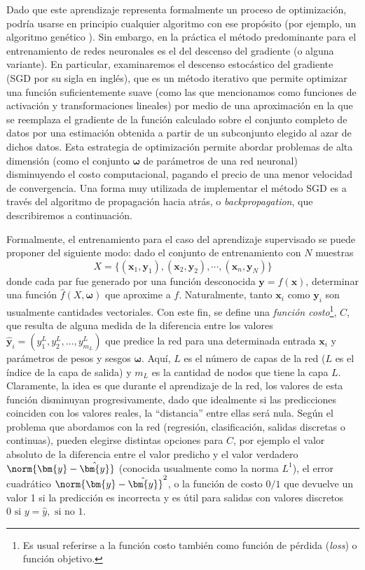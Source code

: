 Dado que este aprendizaje representa formalmente un proceso de optimización, podría usarse en principio cualquier algoritmo con ese propósito (por ejemplo, un algoritmo genético \cite{gupta1999, mirjalili2019, lanham2023}). Sin embargo, en la práctica el método predominante para el entrenamiento de redes neuronales es el del descenso del gradiente (o alguna variante). En particular, examinaremos el descenso estocástico del gradiente (SGD por su sigla en inglés), que es un método iterativo que permite optimizar una función suficientemente suave (como las que mencionamos como funciones de activación y transformaciones lineales) por medio de una aproximación en la que se reemplaza el gradiente de la función calculado sobre el conjunto completo de datos por una estimación obtenida a partir de un subconjunto elegido al azar de dichos datos. Esta estrategia de optimización permite abordar problemas de alta dimensión (como el conjunto $\bm{\omega}$ de parámetros de una red neuronal) disminuyendo el costo computacional, pagando el precio de una menor velocidad de convergencia. Una forma muy utilizada de implementar el método SGD es a través del algoritmo de propagación hacia atrás, o \textit{backpropagation}, que describiremos a continuación.

Formalmente, el entrenamiento para el caso del aprendizaje supervisado se puede proponer del siguiente modo: dado el conjunto de entrenamiento con $N$ muestras
\[ X = \{ (\bm{x}_1,\bm{y}_1), (\bm{x}_2, \bm{y}_2), \cdots, (\bm{x}_n, \bm{y}_N) \} \]
donde cada par fue generado por una función desconocida $\bm{y} = f(\bm{x})$, determinar una función $\hat{f}(X, \bm{\omega})$ que aproxime a $f$. Naturalmente, tanto $\bm{x}_i$ como $\bm{y}_i$ son usualmente cantidades vectoriales. Con este fin, se define una \textit{función costo}\footnote{Es usual referirse a la función costo también como función de pérdida (\textit{loss}) o función objetivo.}, $C$, que resulta de alguna medida de la diferencia entre los valores $\hat{\bm{y}}_i = (y_1^L, y_2^L, \ldots, y_{m_L}^L)$ que predice la red para una determinada entrada $\bm{x}_i$ y parámetros de pesos y sesgos $\bm{\omega}$. Aquí, $L$ es el número de capas de la red ($L$ es el índice de la capa de salida) y $m_L$ es la cantidad de nodos que tiene la capa $L$. Claramente, la idea es que durante el aprendizaje de la red, los valores de esta función disminuyan progresivamente, dado que idealmente si las predicciones coinciden con los valores reales, la ``distancia'' entre ellas será nula. Según el problema que abordamos con la red (regresión, clasificación, salidas discretas o continuas), pueden elegirse distintas opciones para $C$, por ejemplo el valor absoluto de la diferencia entre el valor predicho y el valor verdadero $\norm{\bm{y} - \hat{\bm{y}}}$ (conocida usualmente como la norma $L^1$), el error cuadrático $\norm{\bm{y} - \hat{\bm{y}}}^2$, o la función de costo $0/1$ que devuelve un valor 1 si la predicción es incorrecta y es útil para salidas con valores discretos $0 \text{ si } y = \hat{y}, \text{ si no } 1$. 

